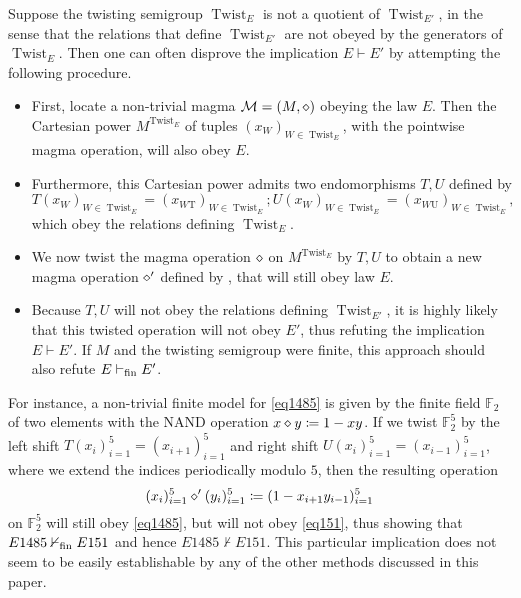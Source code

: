 Suppose the twisting semigroup $\operatorname{Twist}_E$ is not a quotient of $\operatorname{Twist}_{E'}$, in the sense that the relations that define $\operatorname{Twist}_{E'}$ are not obeyed by the generators of $\operatorname{Twist}_E$.  Then one can often disprove the implication $E \vdash E'$ by attempting the following procedure.
\begin{itemize}
\item First, locate a non-trivial magma ${\mathcal{M}} = (M,\diamond)$ obeying the law $E$.  Then the Cartesian power $M^{\operatorname{Twist}_E}$ of tuples $(x_W)_{W \in \operatorname{Twist}_E}$, with the pointwise magma operation, will also obey $E$.
\item Furthermore, this Cartesian power admits two endomorphisms $T, U$ defined by
$$ T (x_W)_{W \in \operatorname{Twist}_E} = (x_{W \mathrm{T}})_{W \in \operatorname{Twist}_E};
U (x_W)_{W \in \operatorname{Twist}_E} = (x_{W \mathrm{U}})_{W \in \operatorname{Twist}_E},$$
which obey the relations defining $\operatorname{Twist}_E$.
\item We now twist the magma operation $\diamond$ on $M^{\operatorname{Twist}_E}$ by $T,U$ to obtain a new magma operation $\diamond'$ defined by , that will still obey law $E$.
\item Because $T, U$ will not obey the relations defining $\operatorname{Twist}_{E'}$, it is highly likely that this twisted operation will not obey $E'$, thus refuting the implication $E \vdash E'$.  If $M$ and the twisting semigroup were finite, this approach should also refute $E \vdash_{\mathrm{fin}} E'$.
\end{itemize}

For instance, a non-trivial finite model for \eqref{eq1485} is given by the finite field $\mathbb{F}_2$ of two elements with the NAND operation $x \diamond y \coloneqq 1-xy$.  If we twist $\mathbb{F}_2^5$ by the left shift $T(x_i)_{i=1}^5 = (x_{i+1})_{i=1}^5$ and right shift $U(x_i)_{i=1}^5 = (x_{i-1})_{i=1}^5$, where we extend the indices periodically modulo $5$, then the resulting operation
$$ (x_i)_{i=1}^5 \diamond' (y_i)_{i=1}^5 \coloneqq (1 - x_{i+1} y_{i-1})_{i=1}^5$$
on $\mathbb{F}_2^5$ will still obey \eqref{eq1485}, but will not obey \eqref{eq151}, thus showing that $E1485 \nvdash_{\mathrm{fin}} E151$ and hence $E1485 \nvdash E151$.  This particular implication does not seem to be easily establishable by any of the other methods discussed in this paper.



